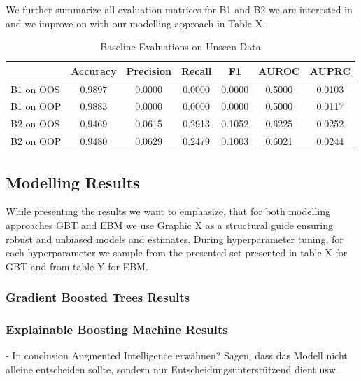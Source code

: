 \documentclass[12pt,titlepage]{article}
\begin{document}
We further summarize all evaluation matrices for B1 and B2 we are interested in and we improve on with our modelling approach in Table X. \\

\begin{table}
    \centering
    \caption{Baseline Evaluations on Unseen Data}
    \begin{tabular}{|l|cccccc|}
    \hline
              & Accuracy & Precision & Recall &   F1   & AUROC & AUPRC  \\
    \hline
    B1 on OOS &  0.9897  &   0.0000  & 0.0000 & 0.0000 & 0.5000 & 0.0103 \\
    B1 on OOP &  0.9883  &   0.0000  & 0.0000 & 0.0000 & 0.5000 & 0.0117 \\
    \hline
    B2 on OOS &  0.9469  &   0.0615  & 0.2913 & 0.1052 & 0.6225 & 0.0252 \\
    B2 on OOP &  0.9480  &   0.0629  & 0.2479 & 0.1003 & 0.6021 & 0.0244 \\
    \hline
    \end{tabular}
\end{table}

\subsection{Modelling Results} \par

While presenting the results we want to emphasize, that for both modelling approaches GBT and EBM we use Graphic X as a structural guide ensuring robust and unbiased models and estimates. During hyperparameter tuning, for each hyperparameter we sample from the presented set presented in table X for GBT and from table Y for EBM. \\

\subsubsection*{Gradient Boosted Trees Results}

\subsubsection*{Explainable Boosting Machine Results}


- In conclusion Augmented Intelligence erwähnen? Sagen, dass das Modell nicht alleine entscheiden sollte, sondern nur Entscheidungsunterstützend dient usw.
\newpage

\thispagestyle{empty}

\printbibliography

\vspace*{6mm}
\end{document}
